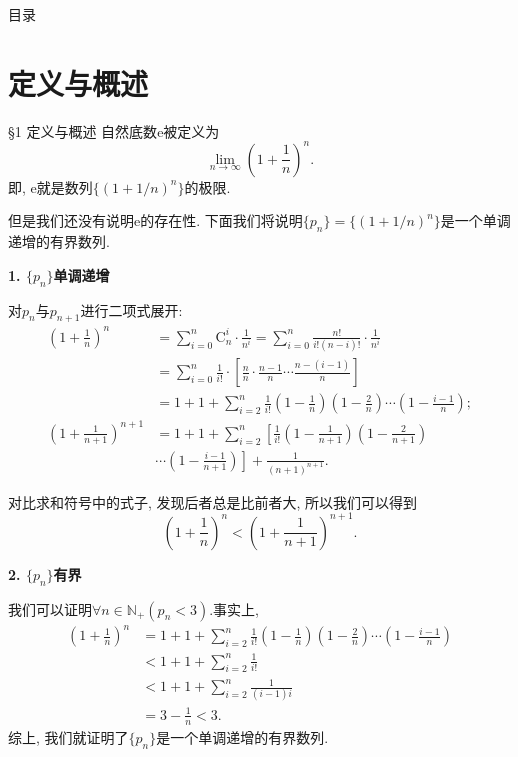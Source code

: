 \documentclass[serif]{beamer}
\begin{document}
\begin{frame}{目录}
	\tableofcontents
\end{frame}

\section{\heiti 定义与概述}

\begin{frame}{\S1 定义与概述}
	自然底数$\mathrm{e}$被定义为
	\[\lim\limits_{n\to\infty}\left(1+\frac{1}{n}\right)^n.\]
	即, $\mathrm{e}$就是数列$\{(1+1/n)^n\}$的极限.\par
	但是我们还没有说明$\mathrm{e}$的存在性. 下面我们将说明$\{p_n\}$$=\{(1+1/n)^n\}$是一个单调递增的有界数列.
\end{frame}

\begin{frame}
	\textbf{1. $\{p_n\}$单调递增}\par
	对$p_n$与$p_{n+1}$进行二项式展开:
	\begin{align*}
		\left(1+\frac{1}{n}\right)^n&=\sum\limits_{i=0}^n{\mathrm{C}_n^i\cdot\frac{1}{n^i}}=\sum\limits_{i=0}^n{\frac{n!}{i!(n-i)!}\cdot\frac{1}{n^i}}\\
		&=\sum\limits_{i=0}^n{\frac{1}{i!}\cdot\left[\frac{n}{n}\cdot\frac{n-1}{n}\cdots\frac{n-(i-1)}{n}\right]}\\
		&=1+1+\sum\limits_{i=2}^n{\frac{1}{i!}\left(1-\frac{1}{n}\right)\left(1-\frac{2}{n}\right)\cdots\left(1-\frac{i-1}{n}\right)};\\
		\left(1+\frac{1}{n+1}\right)^{n+1}&=1+1+\sum\limits_{i=2}^n\left[\frac{1}{i!}\left(1-\frac{1}{n+1}\right)\left(1-\frac{2}{n+1}\right)\right.\\
		&\left.\cdots\left(1-\frac{i-1}{n+1}\right)\right]+\frac{1}{(n+1)^{n+1}}.
	\end{align*}
\end{frame}

\begin{frame}
	对比求和符号中的式子, 发现后者总是比前者大, 所以我们可以得到
	\[\left(1+\frac{1}{n}\right)^n<\left(1+\frac{1}{n+1}\right)^{n+1}.\]\par
\end{frame}

\begin{frame}
	\textbf{2. $\{p_n\}$有界}\par
	我们可以证明$\forall n\in\mathbb{N}_+(p_n<3)$.事实上,
	\begin{align*}
		\left(1+\frac{1}{n}\right)^n&=1+1+\sum\limits_{i=2}^n{\frac{1}{i!}\left(1-\frac{1}{n}\right)\left(1-\frac{2}{n}\right)\cdots\left(1-\frac{i-1}{n}\right)}\\
		&<1+1+\sum\limits_{i=2}^n{\frac{1}{i!}}\\
		&<1+1+\sum\limits_{i=2}^n\frac{1}{(i-1)i}\\
		&=3-\frac{1}{n}<3.
	\end{align*}
	综上, 我们就证明了$\{p_n\}$是一个单调递增的有界数列.
\end{frame}
\end{document}

